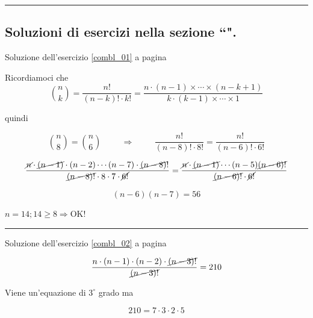 \vspace{1cm}
\hrule
\vspace{1cm}


\subsection{Soluzioni di esercizi nella sezione ``\textbf{}".}

Soluzione dell'esercizio \ref{combl_01} a pagina \pageref{combl_01}\label{combs_01}

Ricordiamoci che 
\begin{equation*}
\binom{n}{k}=\frac{n!}{(n-k)!\cdot k!}
=\frac{
n\cdot(n-1)\times \cdots \times (n-k+1)
}{
k\cdot(k-1)\times \cdots \times 1
}
\end{equation*}

quindi

\begin{equation*}
\binom{n}{8}=\binom{n}{6}
\hspace{1cm}\Rightarrow \hspace{1cm}
\frac{n!}{(n-8)! \cdot 8!} = \frac{n!}{(n-6)! \cdot 6!}
\end{equation*}


\begin{equation*}
\frac{
\cancel{n} \cdot \cancel{(n-1)}\cdot(n-2) \cdots (n-7)\cdot \cancel{(n-8)}!
}
{
\cancel{(n-8)!} \cdot 8 \cdot 7 \cdot \cancel{6!}
} = \frac{
\cancel{n}\cdot\cancel{(n-1)}\cdots(n-5)\cancel{(n-6)!}
}{
\cancel{(n-6)!}\cdot\cancel{6!}
}
\end{equation*}

\begin{equation*}
(n-6)(n-7) = 56
\end{equation*}

$n=14; 14\ge 8 \Rightarrow $OK!

\vspace{1cm}
\hrule
\vspace{1cm}



Soluzione dell'esercizio \ref{combl_02} a pagina \pageref{combl_02}\label{combs_02}

\begin{equation*}
\frac{n\cdot(n-1)\cdot(n-2)\cdot
\cancel{(n-3)!}
}{
\cancel{(n-3)!}
} = 210
\end{equation*}

Viene un'equazione di $3^\circ$ grado ma

\begin{equation*}
210=7\cdot3\cdot2\cdot5
\end{equation*}

